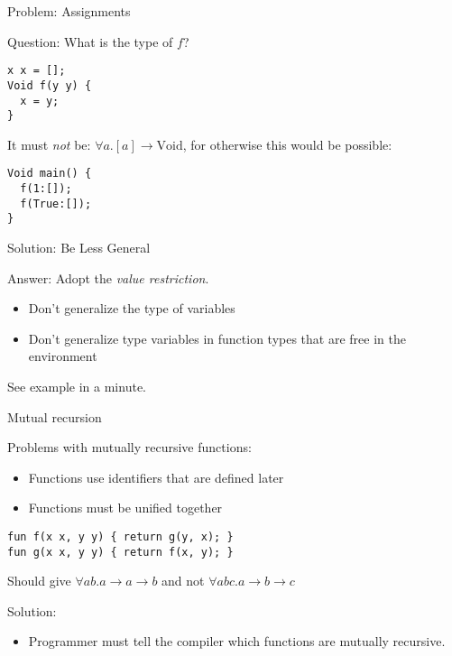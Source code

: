 \documentclass{beamer}
\newcommand{\arr}{\rightarrow}
\begin{document}
\begin{frame}[fragile]{Problem: Assignments}

\onslide<+->

Question: What is the type of $f$?

\begin{verbatim}
x x = [];
Void f(y y) {
  x = y;
}
\end{verbatim}

\onslide<+->

It must \emph{not} be: $\forall a . [a] \arr \text{Void}$, for otherwise
this would be possible:

\begin{verbatim}
Void main() {
  f(1:[]);
  f(True:[]);
}
\end{verbatim}

\end{frame}


\begin{frame}{Solution: Be Less General}

Answer: Adopt the \emph{value restriction}.

\begin{itemize}
  \item Don't generalize the type of variables
  \item Don't generalize type variables in function types that are free
  in the environment
\end{itemize}

See example in a minute.

\end{frame}


\begin{frame}[fragile]{Mutual recursion}

\onslide<+->

Problems with mutually recursive functions:

\begin{itemize}
  \item Functions use identifiers that are defined later
  \item Functions must be unified together
\end{itemize}

\begin{verbatim}
fun f(x x, y y) { return g(y, x); }
fun g(x x, y y) { return f(x, y); }
\end{verbatim}

Should give $\forall ab . a \arr a \arr b$ and not $\forall abc . a
\arr b \arr c$

\onslide<+->

\vspace{1em}

Solution:

\begin{itemize}
  \item Programmer must tell the compiler which functions are mutually
  recursive.
\end{itemize}

\end{frame}
\end{document}
